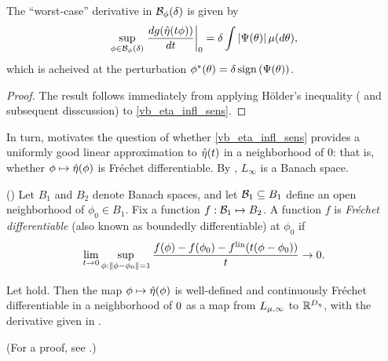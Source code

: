\begin{cor}
%
The ``worst-case'' derivative in $\mathcal{B}_\phi(\delta)$ is given by
%
\begin{align*}
%
\sup_{\phi \in \ball_\phi(\delta)}
    \fracat{d g(\etaopt(\t \phi))}{d \t}{0} =
        \delta \int \abs{\infl(\theta)} \mu(d\theta),
%
\end{align*}
%
which is acheived at the perturbation
$\phi^*(\theta) = \delta \, \mathrm{sign}\left(\Psi(\theta)\right)$.
%
\begin{proof}
%
The result follows immediately from applying H{\"o}lder's inequality
(\citet[Theorem 5.1.2]{dudley:2018:real} and subsequent disscussion)
to \eqref{vb_eta_infl_sens}.
%
\end{proof}
%
\end{cor}


In turn,  motivates the question of whether
\eqref{vb_eta_infl_sens} provides a uniformly good linear approximation to
$\hat\eta(t)$ in a neighborhood of $0$: that is, whether $\phi \mapsto
\hat\eta(\phi)$ is Fr{\'e}chet differentiable. By \citep[Theorem
5.2.1]{dudley:2018:real}, $L_\infty$ is a Banach space.

\begin{defn}
    (\citep[Definition 4.5]{zeidler:2013:functional})
%
Let $B_1$ and $B_2$ denote Banach spaces, and let $\mathcal{B}_1 \subseteq B_1$ define
an open neighborhood of $\phi_0 \in B_1$.  Fix a function $f: \mathcal{B}_1
\mapsto B_2$.
%
A function $f$ is {\em Fr{\'echet} differentiable} (also known as boundedly
differentiable) at $\phi_0$ if
%
\begin{align*}
%
\lim_{t \rightarrow 0}
    \sup_{\phi: \norm{\phi - \phi_0} = 1}
    \frac{f(\phi) - f(\phi_0) -
          f^{\mathrm{lin}}(t (\phi - \phi_0))
         }{t} \rightarrow 0.
%
\end{align*}
%
\end{defn}

\begin{thm}
%
Let  hold. Then the map $\phi \mapsto
\hat\eta(\phi)$ is well-defined and continuously Fr{\'e}chet differentiable in a
neighborhood of $0$ as a map from ${L_{\mu,\infty}}$ to $\mathbb{R}^{D_{\eta}}$,
with the derivative given in .

(For a proof, see  .)

\end{thm}
